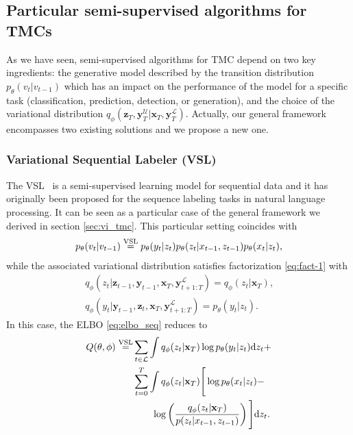 \documentclass{article}
\def\x{{\mathbf x}}
\def\z{{\mathbf z}}
\def\y{{\mathbf y}}
\def\yl{{\mathbf y}_{T}^{\mathcal{L}}}
\def\yu{{\mathbf y}_{T}^{\mathcal{U}}}
\def\L{{\mathcal L}}
\def\p{p_{\theta}}
\def\q{q_\phi}
\def\L{\mathcal{L}}
\def\U{\mathcal{U}}
\newcommand{\katy}[1]{\todo[inline,color=pink]{#1 --- Katy}}
\begin{document}

\subsection{Particular semi-supervised algorithms for TMCs}
\label{subsec:particular_cases}
As we have seen, semi-supervised algorithms for TMC depend on two key ingredients: the generative model described by the transition distribution $\p(v_t|v_{t-1})$ which
has an impact on the
performance of the model for a specific task (classification, prediction, detection, or generation),
and the choice of the variational distribution $\q(\z_T, \yu|\x_T, \yl)$. Actually, our general framework encompasses two existing solutions and we propose a new one.





\subsubsection{Variational Sequential Labeler (VSL)}
The VSL~\cite{chen2019variational} is a semi-supervised learning model for sequential data
and it has originally been proposed for the sequence labeling tasks in natural language processing.
It can be seen as a particular case of the general framework we derived in section \ref{sec:vi_tmc}.
This particular setting coincides with 
\begin{align}
\label{eq:vsl}
\p(v_t|v_{t-1}) \overset{\rm VSL}{=} \p(y_t|z_t) \p(z_t|x_{t-1}, z_{t-1}) \p(x_t|z_t) \text{,}
\end{align}
while the associated variational distribution
satisfies factorization \eqref{eq:fact-1}
with
\begin{align}
 \q(z_t|\z_{t-1},\y_{t-1},\x_T,\y_{t+1:T}^{\L})=\q(z_t|\x_T) \text{,} \\
 \q(y_t|\y_{t-1},\z_t,\x_T,\y_{t+1:T}^{\L})=\p(y_t|z_t) \text{.}
\end{align}
In this case, the ELBO \eqref{eq:elbo_seq} reduces to
\begin{align}
\label{eq:elbo_vsl}
Q(\theta,\phi) \overset{\rm VSL}{=}& \sum_{t \in \L} \int \q(z_{t}| \x_T) \log\p(y_{t}|z_{t}) {\rm d} z_t + \nonumber \\
&  \sum_{t=0}^T \int \q(z_{t}| \x_T) \Bigg[ \log \p(x_t|z_t) -\nonumber\\ 
& \quad \quad  \log \left(\frac{\q(z_t|\x_T)}{p(z_t|x_{t-1}, z_{t-1} )} \right)  \Bigg]  {\rm d} z_t \text{.}
\end{align}
\end{document}

